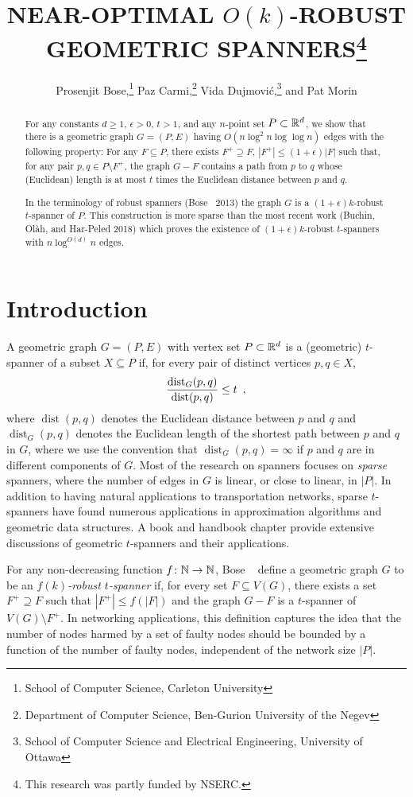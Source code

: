 \documentclass{patmorin}
\title{\MakeUppercase{Near-Optimal }$O(k)$-\MakeUppercase{Robust Geometric Spanners}\thanks{%
This research was partly funded by NSERC.
}}
\author{Prosenjit Bose,\thanks{%
        School of Computer Science, Carleton University}\quad 
        Paz Carmi,\thanks{Department of Computer Science, Ben-Gurion University of the Negev}\quad
        Vida Dujmovi\'c,\thanks{%
        School of Computer Science and Electrical Engineering, University of Ottawa}\quad
        and Pat Morin\footnotemark[2]}
\date{\DTMnow}
\DeclareMathOperator{\dist}{dist}
\begin{document}
\maketitle


\begin{abstract}
  For any constants $d\ge 1$, $\epsilon >0$, $t>1$, and any $n$-point
  set $P\subset\mathbb{R}^d$, we show that there is a geometric graph $G=(P,E)$
  having $O(n\log^2 n\log\log n)$ edges with the following property:
  For any $F\subseteq P$, there exists $F^+\supseteq F$, $|F^+| \le
  (1+\epsilon)|F|$ such that, for any pair $p,q\in P\setminus F^+$,
  the graph $G-F$ contains a path from $p$ to $q$ whose (Euclidean)
  length is at most $t$ times the Euclidean distance between $p$ and $q$.
  
  In the terminology of robust spanners (Bose \etal\ 2013) the graph $G$
  is a $(1+\epsilon)k$-robust $t$-spanner of $P$. This construction is
  more sparse than the most recent work (Buchin, Ol\`ah, and Har-Peled 2018)
  which proves the existence of $(1+\epsilon)k$-robust $t$-spanners with
  $n\log^{O(d)} n$ edges.
\end{abstract}

\section{Introduction}

A geometric graph $G=(P,E)$ with vertex set $P\subset\mathbb{R}^d$ is a (geometric)
$t$-spanner of a subset $X\subseteq P$ if, for every pair of distinct vertices
$p,q\in X$, 
\begin{equation}
  \frac{\dist_G(p,q)}{\dist(p,q)} \le t \enspace , \eqlabel{spanning-ratio}
\end{equation}
where $\dist(p,q)$ denotes the Euclidean distance between $p$ and $q$ and
$\dist_G(p,q)$ denotes the Euclidean length of the shortest path between
$p$ and $q$ in $G$, where we use the convention that $\dist_G(p,q)=\infty$
if $p$ and $q$ are in different components of $G$.  Most of the research
on spanners focuses on \emph{sparse} spanners, where the number of edges
in $G$ is linear, or close to linear, in $|P|$.  In addition to having
natural applications to transportation networks, sparse $t$-spanners have
found numerous applications in approximation algorithms and geometric
data structures.
A book \cite{ns07} and handbook chapter \cite{e99} provide
extensive discussions of geometric $t$-spanners and their applications.

For any non-decreasing function $f\colon\mathbb{N}\to\mathbb{N}$, Bose \etal\
\cite{bose.dujmovic.ea:robust} define a geometric graph $G$ to be an
\emph{$f(k)$-robust $t$-spanner} if, for every set $F\subseteq V(G)$,
there exists a set $F^+\supseteq F$ such that $|F^+|\le f(|F|)$ and
the graph $G-F$ is a $t$-spanner of $V(G)\setminus F^+$.  In networking
applications, this definition captures the idea that the number of nodes
harmed by a set of faulty nodes should be bounded by a function of the
number of faulty nodes, independent of the network size $|P|$.
\end{document}
